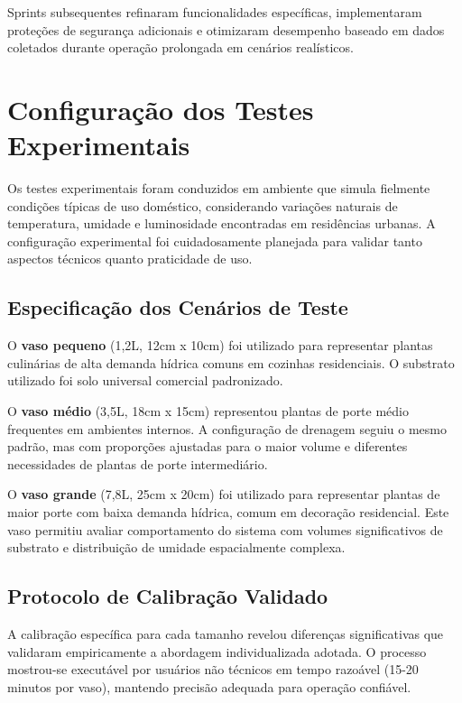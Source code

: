 \documentclass[twoside,english,brazilian]{UNISINOSmonografia}
\begin{document}
Sprints subsequentes refinaram funcionalidades específicas, implementaram proteções de segurança adicionais e otimizaram desempenho baseado em dados coletados durante operação prolongada em cenários realísticos.

\section{Configuração dos Testes Experimentais}

Os testes experimentais foram conduzidos em ambiente que simula fielmente condições típicas de uso doméstico, considerando variações naturais de temperatura, umidade e luminosidade encontradas em residências urbanas. A configuração experimental foi cuidadosamente planejada para validar tanto aspectos técnicos quanto praticidade de uso.

\subsection{Especificação dos Cenários de Teste}

O \textbf{vaso pequeno} (1,2L, 12cm x 10cm) foi utilizado para representar plantas culinárias de alta demanda hídrica comuns em cozinhas residenciais. O substrato utilizado foi solo universal comercial padronizado.

O \textbf{vaso médio} (3,5L, 18cm x 15cm) representou plantas de porte médio frequentes em ambientes internos. A configuração de drenagem seguiu o mesmo padrão, mas com proporções ajustadas para o maior volume e diferentes necessidades de plantas de porte intermediário.

O \textbf{vaso grande} (7,8L, 25cm x 20cm) foi utilizado para representar plantas de maior porte com baixa demanda hídrica, comum em decoração residencial. Este vaso permitiu avaliar comportamento do sistema com volumes significativos de substrato e distribuição de umidade espacialmente complexa.

\subsection{Protocolo de Calibração Validado}

A calibração específica para cada tamanho revelou diferenças significativas que validaram empiricamente a abordagem individualizada adotada. O processo mostrou-se executável por usuários não técnicos em tempo razoável (15-20 minutos por vaso), mantendo precisão adequada para operação confiável.
\end{document}
